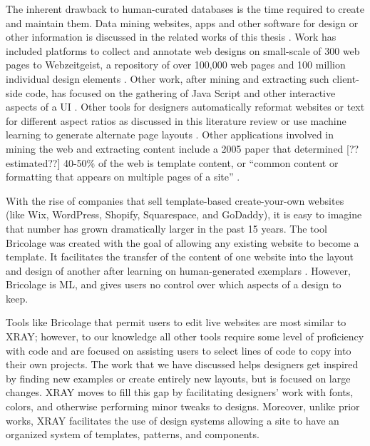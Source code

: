 \documentclass{sigchi}
\newcommand{\xray}{XRAY\xspace}
\begin{document}
The inherent drawback to human-curated databases is the time required to create and maintain them. Data mining websites, apps and other software for design or other information is discussed in the related works of this thesis \cite{mining_data_phd_thesis_uc_boulder_alharbi_yeh_2016}. Work has included platforms to collect and annotate web designs on small-scale of 300 web pages \cite{learning_on_web_design_Satyanarayan_CHI_2012} to Webzeitgeist, a repository of over 100,000 web pages and 100 million individual design elements \cite{Webzeitgeist_Kumar_CHI_2013}. Other work, after mining and extracting such client-side code, has focused on the gathering of Java Script and other interactive aspects of a UI \cite{extracting_client_side_web_app_code_Maras_WWW_2012}. 
Other tools for designers automatically reformat websites \cite{compiling_mockups_to_flexible_UIs_Sinha_ESEC-FSE_2013} or text for different aspect ratios as discussed in this literature review \cite{adaptiveGridBasedLayout_Jacobs_SIGGRAPH_2003} or use machine learning to generate alternate page layouts \cite{learning_layouts_single_page_design_o_donovan_IEEE_2014}. Other applications involved in mining the web and extracting content include a 2005 paper that determined [??estimated??] 40-50\% of the web is template content, or ``common content or formatting that appears on multiple pages of a site'' \cite{volume_evolution_web_templates_Gibson_IW3C2_2005}. 

With the rise of companies that sell template-based create-your-own websites (like Wix, WordPress, Shopify, Squarespace, and GoDaddy), it is easy to imagine that number has grown dramatically larger in the past 15 years. The tool Bricolage was created with the goal of allowing any existing website to become a template. It facilitates the transfer of the content of one website into the layout and design of another after learning on human-generated exemplars \cite{bricolage_Kumar_CHI_2011}. However, Bricolage is ML, and gives users no control over which aspects of a design to keep. 

Tools like Bricolage that permit users to edit live websites are most similar to \xray; however, to our knowledge all other tools require some level of proficiency with code and are focused on assisting users to select lines of code to copy into their own projects. The work that we have discussed helps designers get inspired by finding new examples or create entirely new layouts, but is focused on large changes. \xray moves to fill this gap by facilitating designers' work with fonts, colors, and otherwise performing minor tweaks to designs. Moreover, unlike prior works, \xray facilitates the use of design systems allowing a site to have an organized system of templates, patterns, and components. 
\end{document}
